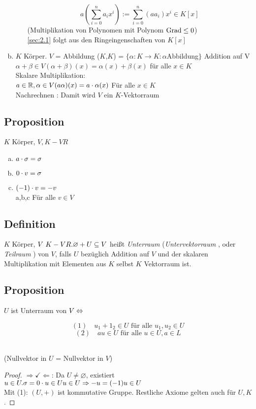 \begin{enumerate}[a)]
\begin{itemize}
\[ a \left(\sum\limits_{i=0}^{n} a_ix^i\right):= \sum\limits_{i=0}^{n} \left(aa_i\right) x^i \in K[x] \]
(Multiplikation von Polynomen mit Polynom $\operatorname{Grad} \leq 0$)\\
\ref{sec:2.1} folgt aus den Ringeingenschaften von $K[x]$
\end{itemize}
\item $K$ Körper. $V$ = Abbildung ($K$,$K$) = $\{\alpha : K \to K : \alpha$Abbildung$ \}$ Addition auf V\\
$\alpha + \beta \in V (\alpha + \beta)(x) = \alpha(x) + \beta(x)$ für alle $x \in K$\\
Skalare Multiplikation:\\
$a \in \mathbb{R}, \alpha \in V (a\alpha)(x) = a \cdot \alpha(x)$ Für alle $x \in K$\\
Nachrechnen : Damit wird $V$ ein $K$-Vektorraum
\end{enumerate}
\subsection{Proposition}
$K$ Körper, $V, K-VR$
\begin{enumerate}[a)]
\item $a \cdot \sigma = \sigma$
\item $0 \cdot v = \sigma$
\item $(-1) \cdot v = -v$\\
a,b,c Für alle $v \in V$
\end{enumerate}
\subsection{Definition}
$K$ Körper, $V\ K-VR.\\
\varnothing + U \subseteq V$ hei\ss t \emph{Unterraum} (\emph{Untervektorraum} , oder \emph{Teilraum} ) von $V$, falls $U$ bezüglich Addition auf $V$ und der skalaren Multiplikation mit Elementen aus $K$ selbst $K$ Vektorraum ist.
\subsection{Proposition}
$U$ ist Unterraum von $V\\
\Leftrightarrow$ \begin{minipage}[t]{.5\textwidth}
$$(1)\quad u_1 + 1_2 \in U \text{ für alle }u_1,u_2 \in U $$
$$(2)\quad au \in U \text{ für alle } u \in U, a \in L$$ 
\end{minipage}\\
(Nullvektor in $U$ = Nullvektor in $V$)\\
\begin{proof}
$\Rightarrow \checkmark
\Leftarrow$: Da $U \ne \varnothing$, existiert $u \in U.\\
\sigma = 0 \cdot u \in U\\
u \in U \Rightarrow -u = (-1)u \in U$\\
Mit (1): $(U,+)$ ist kommutative Gruppe. Restliche Axiome gelten auch für $U,K$.
\end{proof}
